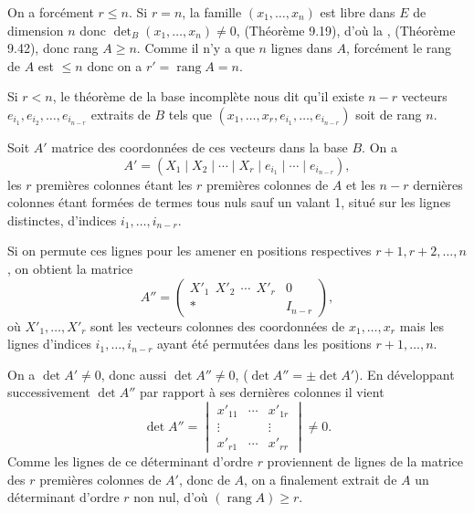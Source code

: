 On a forcément $r\le n$. Si $r=n$, la famille $(x_1,\ldots,x_n)$ est libre dans $E$ de dimension $n$ donc $\det_B(x_1,\ldots,x_n)\ne0$, (Théorème 9.19), d'où la , (Théorème 9.42), donc rang $A\ge n$. Comme il n'y a que $n$ lignes dans $A$, forcément le rang de $A$ est $\le n$ donc on a $r'=\operatorname{rang}A=n$.

Si $r<n$, le théorème de la base incomplète nous dit qu'il existe $n-r$ vecteurs $e_{i_1},e_{i_2},\ldots,e_{i_{n-r}}$ extraits de $B$ tels que $(x_1,\ldots,x_r,e_{i_1},\ldots,e_{i_{n-r}})$ soit de rang $n$.

Soit $A'$ matrice des coordonnées de ces vecteurs dans la base $B$. On a
\[
A'=(X_1\mid X_2\mid\cdots\mid X_r\mid e_{i_1}\mid\cdots\mid e_{i_{n-r}}),
\]
les $r$ premières colonnes étant les $r$ premières colonnes de $A$ et les $n-r$ dernières colonnes étant formées de termes tous nuls sauf un valant 1, situé sur les lignes distinctes, d'indices $i_1,\ldots,i_{n-r}$.

Si on permute ces lignes pour les amener en positions respectives $r+1,r+2,\ldots,n$, on obtient la matrice
\[
A''=\left(\begin{array}{c|c}
X'_1\ \ X'_2\ \ \cdots\ \ X'_r&0\\\hline
*&I_{n-r}
\end{array}\right),
\]
où $X'_1,\ldots,X'_r$ sont les vecteurs colonnes des coordonnées de $x_1,\ldots,x_r$ mais les lignes d'indices $i_1,\ldots,i_{n-r}$ ayant été permutées dans les positions $r+1,\ldots,n$.

On a $\det A'\ne0$, donc aussi $\det A''\ne0$, ($\det A''=\pm\det A'$). En développant successivement $\det A''$ par rapport à ses dernières colonnes il vient
\[
\det A''=\begin{vmatrix}
x'_{11}&\cdots&x'_{1r}\\
\vdots&&\vdots\\
x'_{r1}&\cdots&x'_{rr}
\end{vmatrix}\ne0.
\]
Comme les lignes de ce déterminant d'ordre $r$ proviennent de lignes de la matrice des $r$ premières colonnes de $A'$, donc de $A$, on a finalement extrait de $A$ un déterminant d'ordre $r$ non nul, d'où $(\operatorname{rang}A)\ge r$.

